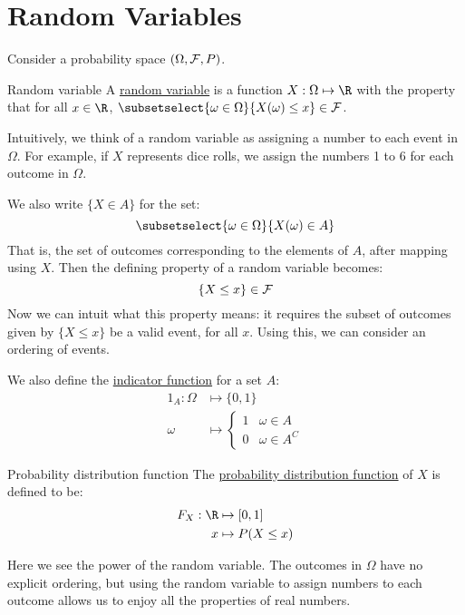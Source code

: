 \documentclass[../Main.tex]{subfiles}
\begin{document}
\section{Random Variables}
Consider a probability space $(\Omega, \mathcal{F}, P)$.
\begin{definition}{Random variable}
    A \underline{random variable} is a function $X: \Omega \mapsto \R$ with the property that for all $x \in \R$, $\subsetselect{\omega \in \Omega}{X(\omega) \leq x} \in \sigalg$.
\end{definition}
Intuitively, we think of a random variable as assigning a number to each event in $\Omega$. For example, if $X$ represents dice rolls, we assign the numbers 1 to 6 for each outcome in $\Omega$.\par
We also write $\{X \in A\}$ for the set:
\begin{equation*}
    \subsetselect{\omega \in \Omega}{X(\omega) \in A}
\end{equation*}
That is, the set of outcomes corresponding to the elements of $A$, after mapping using $X$. Then the defining property of a random variable becomes:
\begin{equation*}
    \{X \leq x\} \in \mathcal{F}
\end{equation*}
Now we can intuit what this property means: it requires the subset of outcomes given by $\{X \leq x\}$ be a valid event, for all $x$. Using this, we can consider an ordering of events.\par
We also define the \underline{indicator function} for a set $A$:
\begin{align*}
    1_A : \Omega &\mapsto \{0, 1\} \\
    \omega &\mapsto
    \begin{cases}
        1 & \omega \in A \\
        0 & \omega \in A^C
    \end{cases}
\end{align*}
\begin{definition}{Probability distribution function}
    The \underline{probability distribution function} of $X$ is defined to be:
    \begin{align*}
        F_X : \R &\mapsto [0, 1] \\
        x &\mapsto P(X \leq x)
    \end{align*}
\end{definition}
Here we see the power of the random variable. The outcomes in $\Omega$ have no explicit ordering, but using the random variable to assign numbers to each outcome allows us to enjoy all the properties of real numbers.
\end{document}
